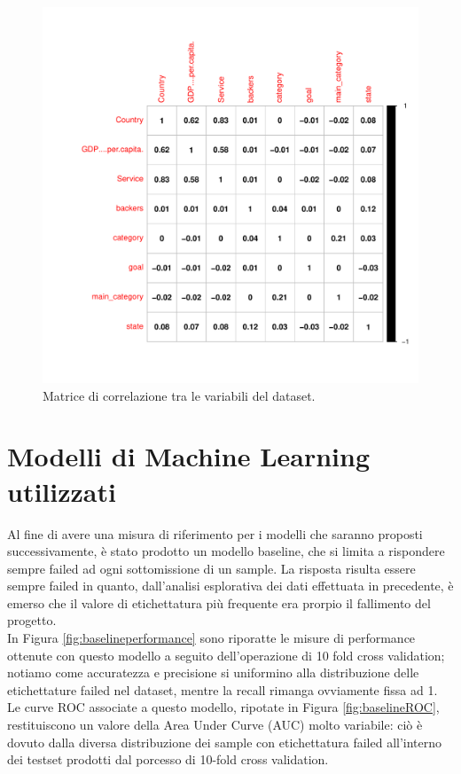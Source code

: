 \begin{figure}
	\centering
	\includegraphics[width=1\linewidth]{../FinalResults/Images/Data_exploration_plots/corrplot}
	\caption{Matrice di correlazione tra le variabili del dataset.}
	\label{fig:corrplot}
\end{figure}


\section{Modelli di Machine Learning utilizzati}
Al fine di avere una misura di riferimento per i modelli che saranno proposti successivamente, è stato prodotto un modello baseline, che si limita a rispondere sempre failed ad ogni sottomissione di un sample. La risposta risulta essere sempre failed in quanto, dall'analisi esplorativa dei dati effettuata in precedente, è emerso che il valore di etichettatura più frequente era prorpio il fallimento del progetto.\\
In Figura \ref{fig:baselineperformance} sono riporatte le misure di performance ottenute con questo modello a seguito dell'operazione di 10 fold cross validation; notiamo come accuratezza e precisione si uniformino alla distribuzione delle etichettature failed nel dataset, mentre la recall rimanga ovviamente fissa ad 1.\\
Le curve ROC associate a questo modello, ripotate in Figura \ref{fig:baselineROC}, restituiscono un valore della Area Under Curve (AUC) molto variabile: ciò è dovuto dalla diversa distribuzione dei sample con etichettatura failed all'interno dei testset prodotti dal porcesso di 10-fold cross validation.

